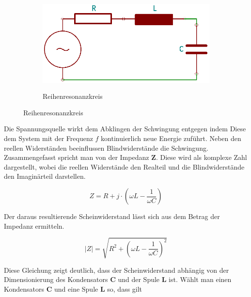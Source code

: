 {{\begin{figure}
    \begin{minipage}[r]{0.5\textwidth}
      \vspace{-16pt}
\begin{figure}[H]
  \centering
  \includegraphics[width=\textwidth]{Graphics/ResonanceCircuit_serial.png}
  \caption{Reihenresonanzkreis}{}
  \label{resonance_circuit_serial}
\end{figure}
      \vspace{-10pt}  
    \end{minipage}  
\end{figure}

\noindent Die Spannungsquelle wirkt dem Abklingen der Schwingung entgegen indem Diese dem System mit der Frequenz \(f\) kontinuierlich neue Energie zuführt. Neben den reellen Widerständen beeinflussen Blindwiderstände die Schwingung. Zusammengefasst spricht man von der Impedanz \textbf{Z}. Diese wird als komplexe Zahl dargestellt, wobei die reellen Widerstände den Realteil und die Blindwiderstände den Imaginärteil darstellen.

\begin{equation}
  Z = R + j \cdot (\omega L - \frac{1}{\omega C})
  \label{eq:Impedance}
\end{equation}

\noindent Der daraus resultierende Scheinwiderstand lässt sich aus dem Betrag der Impedanz ermitteln.

\begin{equation}
  |Z| = \sqrt{R^2 + (\omega L - \frac{1}{\omega C})^2}
  \label{eq:Impedance2}
\end{equation}

\noindent Diese Gleichung zeigt deutlich, dass der Scheinwiderstand abhängig von der Dimensionierung des Kondensators \textbf{C} und der Spule \textbf{L} ist. Wählt man einen Kondensators \textbf{C} und eine Spule \textbf{L} so, dass gilt

}}
